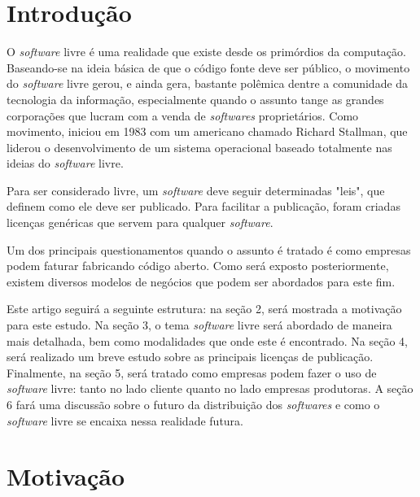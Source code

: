 \documentclass{classe_cn}                 %
\begin{document}

\section{Introdução}

O \textit{software} livre é uma realidade que existe desde os primórdios da computação. Baseando-se na ideia básica de que o código fonte deve ser público, o movimento do \textit{software} livre gerou, e ainda gera, bastante polêmica dentre a comunidade da tecnologia da informação, especialmente quando o assunto tange as grandes corporações que lucram com a venda de \textit{softwares} proprietários. Como movimento, iniciou em 1983 com um americano chamado Richard Stallman, que liderou o desenvolvimento de um sistema operacional baseado totalmente nas ideias do \textit{software} livre.

Para ser considerado livre, um \textit{software} deve seguir determinadas "leis", que definem como ele deve ser publicado. Para facilitar a publicação, foram criadas licenças genéricas que servem para qualquer \textit{software}.

Um dos principais questionamentos quando o assunto é tratado é como empresas podem faturar fabricando código aberto. Como será exposto posteriormente, existem diversos modelos de negócios que podem ser abordados para este fim.

Este artigo seguirá a seguinte estrutura: na seção 2, será mostrada a motivação para este estudo. Na seção 3, o tema \textit{software} livre será abordado de maneira mais detalhada, bem como modalidades que onde este é encontrado. Na seção 4, será realizado um breve estudo sobre as principais licenças de publicação. Finalmente, na seção 5, será tratado como empresas podem fazer o uso de \textit{software} livre: tanto no lado cliente quanto no lado empresas produtoras. A seção 6 fará uma discussão sobre o futuro da distribuição dos \textit{softwares} e como o \textit{software} livre se encaixa nessa realidade futura.


\section{Motivação}
\end{document}

